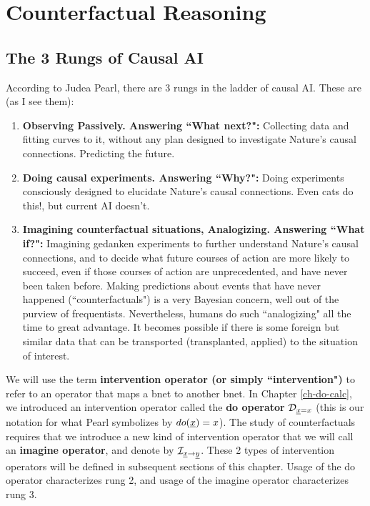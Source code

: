 \chapter{Counterfactual Reasoning}
\label{ch-counterf}


\section{The 3 Rungs of Causal AI}
According to
Judea Pearl,
there are 3 rungs in the
ladder of causal AI.
These are (as I see them):
\begin{enumerate}
\item
{\bf Observing Passively. Answering ``What next?":} Collecting
data
and fitting curves to it,
without any plan
designed to
investigate Nature's
causal connections. Predicting the future.
\item {\bf Doing causal
experiments. Answering ``Why?":}
Doing experiments
consciously designed to
elucidate
Nature's causal connections.
Even cats do this!, but current AI doesn't.
\item {\bf Imagining
 counterfactual situations, Analogizing. Answering ``What if?":}
Imagining gedanken experiments
to further understand
Nature's causal connections,
and to decide what future
courses of action are
more likely to succeed,
even if
those courses of action
are unprecedented, and have never been taken before.
Making
predictions about
 events that have never happened (``counterfactuals")
is a very Bayesian
concern, well out of the purview of
frequentists. Nevertheless,
humans do such
``analogizing"
all the time to great advantage.
It becomes
possible if there
is some foreign but similar
data that can be transported
(transplanted, applied)
to the situation of
interest.


\end{enumerate}

We will use the
term {\bf intervention operator (or simply ``intervention")}
to refer to an operator
that maps a bnet to another bnet.
In Chapter \ref{ch-do-calc},
we introduced an intervention operator
 called the {\bf do operator}
${\cal D}_{{\underline{x}}=x}$ (this is our notation for what Pearl
symbolizes by $do({\underline{x}})=x$).
The study of counterfactuals
requires that we
introduce a new
kind of intervention
operator that we will
call an {\bf imagine operator},
and denote by
${\cal I}_{{\underline{x}}\rightarrow{\underline{y}}}$.
These 2 types of intervention
operators
will be defined
in subsequent sections of this chapter.
Usage of the do operator 
characterizes rung 2, and usage of 
the imagine operator characterizes
rung 3.

